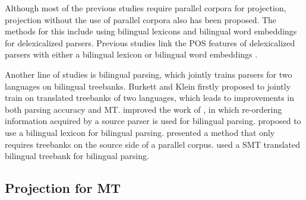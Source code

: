 \documentclass[english]{jnlp_1.4}
\begin{document}
Although most of the previous studies require parallel corpora for projection, projection without the use of 
parallel corpora also has been proposed. The {methods} for this include using bilingual lexicons 
\cite{durrett-pauls-klein:2012:EMNLP-CoNLL} and bilingual word embeddings \cite{duong-EtAl:2015:CoNLL} 
for delexicalized parsers. Previous studies link the POS features of delexicalized parsers with either 
a bilingual lexicon \cite{durrett-pauls-klein:2012:EMNLP-CoNLL} or bilingual word embeddings \cite{duong-EtAl:2015:CoNLL}.

Another line of studies is bilingual parsing, which jointly trains parsers for two languages on bilingual treebanks. 
Burkett and Klein \citeyear{burkett-klein:2008:EMNLP} firstly proposed to jointly train on translated treebanks 
of two languages, which leads to improvements in both parsing accuracy and MT.  improved the work of \cite{burkett-klein:2008:EMNLP}, 
in which re-ordering information acquired by a source parser is used for bilingual parsing. 
 proposed to use a bilingual lexicon for bilingual parsing. 
 presented a method that only requires treebanks 
on the source side of a parallel corpus.  used a SMT translated 
bilingual treebank for bilingual parsing.


\subsection{Projection for MT}
\end{document}
